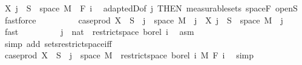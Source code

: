 \begin{isabellebody}
\ {\isachardoublequoteopen}X\ j\ {\isacharminus}{\kern0pt}{\isacharbackquote}{\kern0pt}\ S\ {\isasyminter}\ space\ M\ {\isasymin}\ F\ i{\isachardoublequoteclose}\ \isamarkupfalse%
\ adaptedD{\isacharbrackleft}{\kern0pt}of\ j{\isacharcomma}{\kern0pt}\ THEN\ measurable{\isacharunderscore}{\kern0pt}sets{\isacharbrackright}{\kern0pt}\ space{\isacharunderscore}{\kern0pt}F\ open{\isacharunderscore}{\kern0pt}S\ \isamarkupfalse%
\ fastforce\isanewline
\ \ \ \ \ \ \isamarkupfalse%
\ \isamarkupfalse%
\ {\isachardoublequoteopen}case{\isacharunderscore}{\kern0pt}prod\ X\ {\isacharminus}{\kern0pt}{\isacharbackquote}{\kern0pt}\ S\ {\isasyminter}\ {\isacharbraceleft}{\kern0pt}j{\isacharbraceright}{\kern0pt}\ {\isasymtimes}\ space\ M\ {\isacharequal}{\kern0pt}\ {\isacharbraceleft}{\kern0pt}j{\isacharbraceright}{\kern0pt}\ {\isasymtimes}\ {\isacharparenleft}{\kern0pt}X\ j\ {\isacharminus}{\kern0pt}{\isacharbackquote}{\kern0pt}\ S\ {\isasyminter}\ space\ M{\isacharparenright}{\kern0pt}{\isachardoublequoteclose}\ \ j\ \isamarkupfalse%
\ fast\isanewline
\ \ \ \ \ \ \isamarkupfalse%
\ \isamarkupfalse%
\ {\isachardoublequoteopen}{\isacharbraceleft}{\kern0pt}j\ {\isacharcolon}{\kern0pt}{\isacharcolon}{\kern0pt}\ nat{\isacharbraceright}{\kern0pt}\ {\isasymin}\ restrict{\isacharunderscore}{\kern0pt}space\ borel\ {\isacharbraceleft}{\kern0pt}{}{\isachardot}{\kern0pt}{\isachardot}{\kern0pt}i{\isacharbraceright}{\kern0pt}{\isachardoublequoteclose}\ \isamarkupfalse%
\ asm\ \isamarkupfalse%
\ {\isacharparenleft}{\kern0pt}simp\ add{\isacharcolon}{\kern0pt}\ sets{\isacharunderscore}{\kern0pt}restrict{\isacharunderscore}{\kern0pt}space{\isacharunderscore}{\kern0pt}iff{\isacharparenright}{\kern0pt}\isanewline
\ \ \ \ \ \ \isamarkupfalse%
\ \isamarkupfalse%
\ {\isachardoublequoteopen}case{\isacharunderscore}{\kern0pt}prod\ X\ {\isacharminus}{\kern0pt}{\isacharbackquote}{\kern0pt}\ S\ {\isasyminter}\ {\isacharbraceleft}{\kern0pt}j{\isacharbraceright}{\kern0pt}\ {\isasymtimes}\ space\ M\ {\isasymin}\ restrict{\isacharunderscore}{\kern0pt}space\ borel\ {\isacharbraceleft}{\kern0pt}{}{\isachardot}{\kern0pt}{\isachardot}{\kern0pt}i{\isacharbraceright}{\kern0pt}\ {\isasymOtimes}\isactrlsub M\ F\ i{\isachardoublequoteclose}\ \isamarkupfalse%
\ simp\isanewline
\ \ \ \ \isacommand{{\isacharbraceright}{\kern0pt}}\isamarkupfalse%
\isanewline
\ \ \ \ \isamarkupfalse%

\end{isabellebody}
